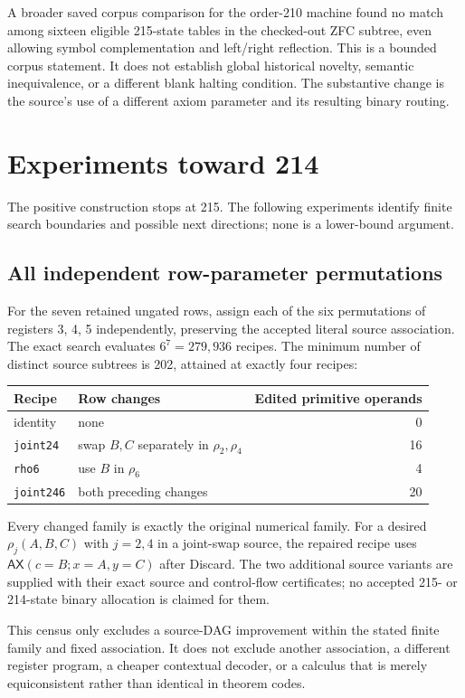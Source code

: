 \documentclass[11pt,a4paper]{article}
\theoremstyle{remark}\newtheorem{remark}[theorem]{Remark}
\newcommand{\AX}{\mathsf{AX}}
\begin{document}
A broader saved corpus comparison for the order-210 machine found no
match among sixteen eligible 215-state tables in the checked-out ZFC
subtree, even allowing symbol complementation and left/right reflection.
This is a bounded corpus statement. It does not establish global
historical novelty, semantic inequivalence, or a different blank
halting condition. The substantive change is the source's use of a
different axiom parameter and its resulting binary routing.

\section{Experiments toward 214}

The positive construction stops at 215. The following experiments
identify finite search boundaries and possible next directions;
none is a lower-bound argument.

\subsection{All independent row-parameter permutations}

For the seven retained ungated rows, assign each of the six permutations
of registers 3, 4, 5 independently, preserving the accepted literal
source association. The exact search evaluates
$6^7=279,936$ recipes. The minimum number of distinct source subtrees
is 202, attained at exactly four recipes:
\begin{center}
\begin{tabular}{@{}llr@{}}
\toprule
Recipe & Row changes & Edited primitive operands\\
\midrule
identity & none & 0\\
\texttt{joint24} & swap $B,C$ separately in $\rho_2,\rho_4$ & 16\\
\texttt{rho6} & use $B$ in $\rho_6$ & 4\\
\texttt{joint246} & both preceding changes & 20\\
\bottomrule
\end{tabular}
\end{center}
Every changed family is exactly the original numerical family.
For a desired $\rho_j(A,B,C)$ with $j=2,4$ in a joint-swap source,
the repaired recipe uses $\AX(c=B;x=A,y=C)$ after Discard.
The two additional source variants are supplied with their exact
source and control-flow certificates; no accepted 215- or 214-state
binary allocation is claimed for them.

This census only excludes a source-DAG improvement within the stated
finite family and fixed association. It does not exclude another
association, a different register program, a cheaper contextual decoder,
or a calculus that is merely equiconsistent rather than identical in
theorem codes.
\end{document}
